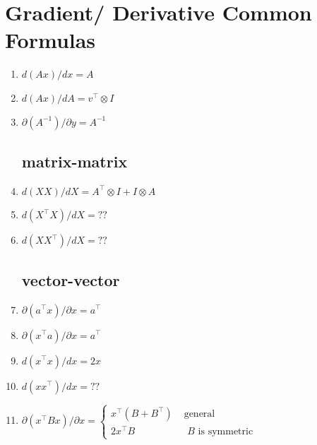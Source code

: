 \section{Gradient/ Derivative Common Formulas}\label{matrix-vector: Gradient/ Derivative Common Formulas}

\begin{enumerate}[itemsep=0.2cm]
    \subsection{Matrix-vector}
    
    \item \( d(Ax)/dx = A \)

    \item $d(Ax)/dA = v^\top\otimes I $
    
    \item \( \partial (A^{-1})/\partial y = A^{-1}\)

    \subsection{matrix-matrix}
    \item \(
        d(XX)/dX = A^\top \otimes I+I\otimes A
    \)
    
    \item  $d(X^\top X)/dX = ??$
    
    \item  $d(XX^\top )/dX = ??$

    \subsection{vector-vector}
    \item  $\partial (a^\top x)/\partial x = a^\top$

    \item $\partial (x^\top a)/\partial x = a^\top$

    \item  $d(x^\top x)/dx = 2x$

    \item  $d(xx^\top)/dx = ??$

    \item  \(
        \partial (x^\top Bx)/\partial x = \begin{cases}
            x^\top(B + B^\top) & \text{ general}\\
            2x^\top B & \text{ $B$ is symmetric}
        \end{cases}
    \)


\end{enumerate}
